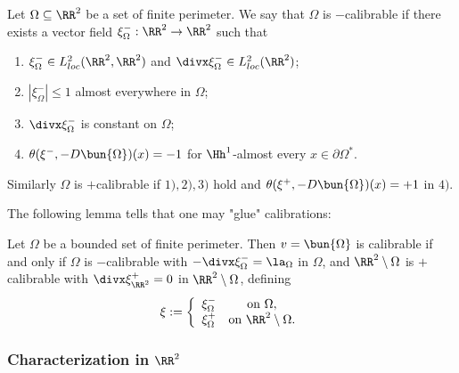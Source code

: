 \begin{defn}
Let $\Omega \subseteq \RR^2$ be a set of finite perimeter. We say that $\Omega$ is $-$calibrable if there exists a vector field $\xi^-_\Omega: \RR^2\rightarrow \RR^2$ 
such that 
\begin{enumerate}
  \item $\xi^-_\Omega\in L^2_{loc}(\RR^2,\RR^2)$ and $\divx \xi^-_\Omega \in L^2_{loc}(\RR^2)$;
  \item $|\xi^-_{\Omega}| \leq 1$ almost everywhere in $\Omega$;
  \item $\divx \xi^-_\Omega$ is constant on $\Omega$;
  \item $\theta(\xi^-,-D\bun{\Omega})(x)=-1$ for $\Hh^1$-almost every $x\in \partial \Omega^*$.
\end{enumerate}
Similarly $\Omega$ is $+$calibrable if $1),2),3)$ hold and $\theta(\xi^+,-D\bun{\Omega})(x)=+1$ in $4)$.
\end{defn}
The following lemma tells that one may "glue" calibrations:
\begin{lem}
  Let  $\Omega$ be a bounded set of finite perimeter. Then $v=\bun{\Omega}$ is calibrable if and only if $\Omega$ is $-$calibrable with $-\divx \xi^-_{\Omega}=\la_\Omega$ in $\Omega$, and $\RR^2\setminus \Omega$ is $+$calibrable with $\divx \xi^+_{\RR^2}=0$ in $\RR^2\setminus \Omega$,
  defining
  \begin{align*}
    \xi:= \left\{ \begin{array}{cc}
        \xi^-_\Omega & \mbox{on }  \Omega,\\
        \xi^+_\Omega & \mbox{on } \RR^2\setminus \Omega.
    \end{array}\right.
  \end{align*}
\end{lem}



\subsubsection{Characterization in $\RR^2$}

